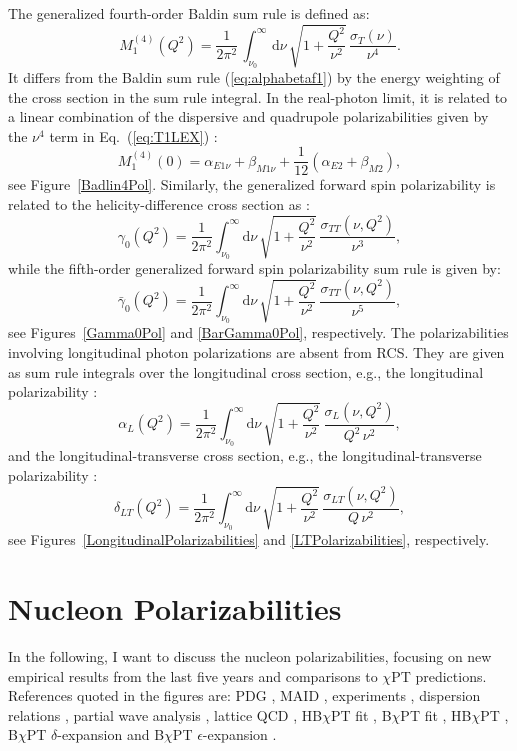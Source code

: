 \documentclass[preprints,review,accept,moreauthors,pdftex]{Definitions/mdpi}
\def\beq{\begin{equation}}
\def\eeq{\end{equation}}
\def\eqlab#1{\label{eq:#1}}
\def\eref#1{(\ref{eq:#1})}
\def\Eqref#1{Eq.~(\ref{eq:#1})}
\def\al{\alpha}
\def\dd{\mathrm{d}}
\begin{document}
The generalized fourth-order Baldin sum rule is defined as:
\beq
 M_1^{(4)}(Q^2)=
\frac{1}{2 \pi^2} \, \int_{\nu_0}^{\infty}\, \mathrm{d}\nu \,\sqrt{1+\frac{Q^2}{\nu^{2}}}\, \frac{\sigma_T(\nu)}{\nu^{4} }.
\eeq
It differs from the Baldin sum rule \eref{alphabetaf1} by the energy weighting of the cross section in the sum rule integral.
In the real-photon limit, it is related to a linear combination of the dispersive and quadrupole polarizabilities given by the $\nu^4$ term in \Eqref{T1LEX} \cite{Guiasu:1978dz,Holstein:1999uu}:
\beq
M_1^{(4)}(0)=\alpha_{E1 \nu} + \beta_{M1 \nu} + \frac{1}{12} (\alpha_{E2} + \beta_{M2}),
\eeq
see  Figure~\ref{Badlin4Pol}. Similarly, the generalized forward spin polarizability is related to the helicity-difference cross section as \cite{Drechsel:2002ar}: 
\beq
\eqlab{g0gen}
\gamma_0(Q^2)=\frac{1}{2 \pi^2} \int_{\nu_0}^\infty \! \dd\nu\,\sqrt{1+\frac{Q^2}{\nu^2}} \,\frac{\sigma_{TT} (\nu,Q^2)}{\nu^3},
\eeq
while the fifth-order generalized forward spin polarizability sum rule is given by: \beq
\bar\gamma_0 (Q^2)= \frac{1}{2 \pi^2} \int_{\nu_0}^\infty \! \dd\nu\,\sqrt{1+\frac{Q^2}{\nu^2}} \,\frac{\sigma_{TT} (\nu,Q^2)}{\nu^5},
\eeq
see Figures~\ref{Gamma0Pol} and \ref{BarGamma0Pol}, respectively.
The polarizabilities involving longitudinal photon polarizations are absent from RCS. They are given as sum rule integrals over the longitudinal cross section, e.g., the longitudinal polarizability \cite{Lensky:2014dda}:
\beq
\al_{L}(Q^2)=\frac{1}{2 \pi^2} \int_{\nu_0}^\infty\! \dd\nu\,\sqrt{1+\frac{Q^2}{\nu^{2}}}\,            \frac{\sigma_L (\nu,Q^2)}{Q^2\, \nu^{2}},
\eeq
and the longitudinal-transverse cross section, e.g., the longitudinal-transverse polarizability \cite{Drechsel:2002ar}:
\beq
\eqlab{dLTgen}
\delta_{LT}(Q^2)=\frac{1}{2 \pi^2} \int_{\nu_0}^\infty \! \dd\nu\,\sqrt{1+\frac{Q^2}{\nu^{2}}}\, \frac{\sigma_{LT} (\nu,Q^2)}{Q\,\nu^2},
\eeq
see Figures~\ref{LongitudinalPolarizabilities} and \ref{LTPolarizabilities}, respectively.



\section{Nucleon Polarizabilities}\label{results}

In the following, I want to discuss the nucleon polarizabilities, focusing on new empirical results from the last five years and comparisons to $\chi$PT predictions.
References quoted in the figures are: PDG \cite{Zyla:2020}, MAID \cite{MAID}, experiments \cite{Paudyal:2019mee,Martel:2017pln,Sokhoyan:2016yrc,Martel:2014pba,Dutz:2003mm,Kossert:2002ws}, dispersion relations \cite{Schumacher:2019ikn, Pasquini:2019nnx,Pasquini:2017ehj,Gryniuk:2016gnm,Pasquini:2010zr,Holstein:1999uu,Babusci:1998ww,Schroder:1977sn}, partial wave analysis \cite{Krupina:2017pgr}, lattice QCD \cite{Bignell:2020xkf,Lujan:2016ffj,Hall:2013dva,Detmold:2010ts, Engelhardt:2007ub,Christensen:2004ca}, HB$\chi$PT fit \cite{Griesshammer:2015ahu,McGovern:2012ew,Griesshammer:2012we}, B$\chi$PT fit \cite{Lensky:2014efa}, HB$\chi$PT \cite{Bernard:1993ry,Knoechlein97,Nevado:2007dd}, B$\chi$PT $\delta$-expansion \cite{Lensky:2015awa,Alarcon:2020wjg,Alarcon:2020icz} and B$\chi$PT $\epsilon$-expansion \cite{Bernard:2012hb}.
\end{document}
